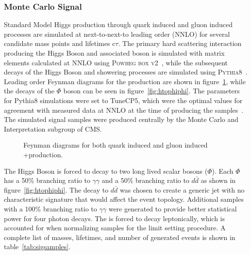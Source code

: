 \subsubsection{Monte Carlo Signal} \label{sec:ana_mcsig}
Standard Model Higgs production through quark induced and gluon induced \ZH processes are simulated at next-to-next-to leading order (NNLO) for several candidate mass points \mphi and lifetimes c$\tau$. The primary hard scattering interaction producing the Higgs Boson and associated \PZ boson is simulated with matrix elements calculated at NNLO using \textsc{Powheg box v2}~\cite{powheg}, while the subsequent decays of the Higgs Boson and showering processes are simulated using \textsc{Pythia8}~\cite{pythia8}. Leading order Feynman diagrams for the \ZH production are shown in figure~\ref{fig:ZH_feynman}, while the decays of the $\Phi$ boson can be seen in figure~\ref{fig:htophiphi}. The parameters for Pythia8 simulations were set to TuneCP5, which were the optimal values for agreement with measured data at NNLO at the time of producing the samples~\cite{tunecp5}. The simulated signal samples were produced centrally by the Monte Carlo and Interpretation subgroup of CMS.

\begin{figure}[htb!]
	\centering
	\begingroup
	\hfill
	
	\hfill
	
	\hfill
	
	\hfill
	\endgroup
	\caption[Feynman diagrams for both quark induced and gluon induced \PZns+\PH production.]{Feynman diagrams for both quark induced and gluon induced \PZns+\PH production.}
	\label{fig:ZH_feynman}
\end{figure}

The Higgs Boson is forced to decay to two long lived scalar bosons ($\Phi$). Each $\Phi$ has a 50\% branching ratio to $\gamma\gamma$ and a 50\% branching ratio to $d\bar{d}$ as shown in figure~\ref{fig:htophiphi}. The decay to $d\bar{d}$ was chosen to create a generic jet with no characteristic signature that would affect the event topology. Additional samples with a 100\% branching ratio to $\gamma\gamma$ were generated to provide better statistical power for four photon decays. The \PZ is forced to decay leptonically, which is accounted for when normalizing samples for the limit setting procedure. A complete list of masses, lifetimes, and number of generated events is shown in table~\ref{tab:sigsamples}.

